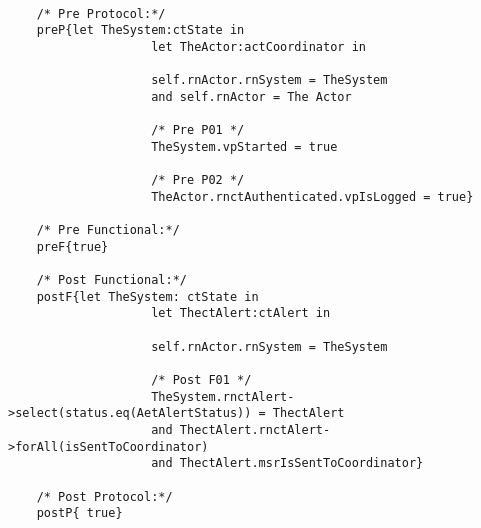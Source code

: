 	\scriptsize
	\vspace{0.5cm}
	\begin{lstlisting}[style=MessirStyle,firstnumber=auto,captionpos=b,caption={\msrmessir (MCL-oriented) specification of the operation \emph{oeGetAlertSet}.},label=OM-actCoordinator-oeGetAlertSet-MCL-LST]

	/* Pre Protocol:*/ 
	preP{let TheSystem:ctState in
					let TheActor:actCoordinator in
					
					self.rnActor.rnSystem = TheSystem
					and self.rnActor = The Actor
					
					/* Pre P01 */
					TheSystem.vpStarted = true
					
					/* Pre P02 */
					TheActor.rnctAuthenticated.vpIsLogged = true}
	
	/* Pre Functional:*/
	preF{true}
	
	/* Post Functional:*/ 
	postF{let TheSystem: ctState in
					let ThectAlert:ctAlert in
					
					self.rnActor.rnSystem = TheSystem
					
					/* Post F01 */
					TheSystem.rnctAlert->select(status.eq(AetAlertStatus)) = ThectAlert
					and ThectAlert.rnctAlert->forAll(isSentToCoordinator)
					and ThectAlert.msrIsSentToCoordinator}
	
	/* Post Protocol:*/ 
	postP{ true}
	
	\end{lstlisting}
	\normalsize 
	
	
	
	





